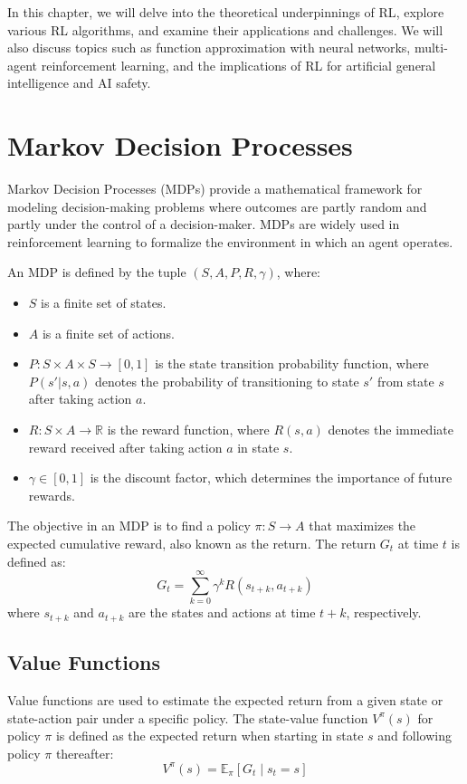 In this chapter, we will delve into the theoretical underpinnings of \gls{RL}, explore various \gls{RL} algorithms, and examine their applications and challenges.
We will also discuss topics such as function approximation with neural networks, multi-agent reinforcement learning, and the implications of \gls{RL} for artificial general intelligence and AI safety.

\section{Markov Decision Processes}

Markov Decision Processes (MDPs) provide a mathematical framework for modeling decision-making problems where outcomes are partly random and partly under the control of a decision-maker. MDPs are widely used in reinforcement learning to formalize the environment in which an agent operates.

An MDP is defined by the tuple $(S, A, P, R, \gamma)$, where:
\begin{itemize}
    \item $S$ is a finite set of states.
    \item $A$ is a finite set of actions.
    \item $P: S \times A \times S \rightarrow [0,1]$ is the state transition probability function, where $P(s'|s,a)$ denotes the probability of transitioning to state $s'$ from state $s$ after taking action $a$.
    \item $R: S \times A \rightarrow \mathbb{R}$ is the reward function, where $R(s,a)$ denotes the immediate reward received after taking action $a$ in state $s$.
    \item $\gamma \in [0,1]$ is the discount factor, which determines the importance of future rewards.
\end{itemize}

The objective in an MDP is to find a policy $\pi: S \rightarrow A$ that maximizes the expected cumulative reward, also known as the return. The return $G_t$ at time $t$ is defined as:
\[
G_t = \sum_{k=0}^{\infty} \gamma^k R(s_{t+k}, a_{t+k})
\]
where $s_{t+k}$ and $a_{t+k}$ are the states and actions at time $t+k$, respectively.

\subsection{Value Functions}

Value functions are used to estimate the expected return from a given state or state-action pair under a specific policy. The state-value function $V^{\pi}(s)$ for policy $\pi$ is defined as the expected return when starting in state $s$ and following policy $\pi$ thereafter:
\[
V^{\pi}(s) = \mathbb{E}_{\pi} \left[ G_t \mid s_t = s \right]
\]

